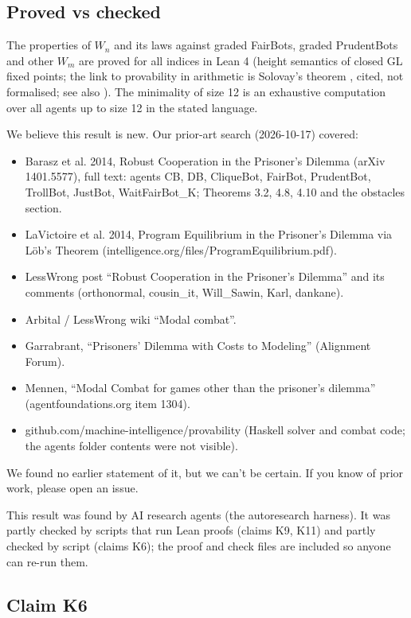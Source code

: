 \documentclass{article}
\begin{document}
\subsection*{Proved vs checked}

The properties of $W_n$ and its laws against graded FairBots, graded PrudentBots and other
$W_m$ are proved for all indices in Lean 4 (height semantics of closed GL fixed points; the link
to provability in arithmetic is Solovay's theorem \cite{solovay1976provability}, cited, not formalised; see also \cite{boolos1993logic}). The minimality of size
12 is an exhaustive computation over all agents up to size 12 in the stated language.

We believe this result is new. Our prior-art search (2026-10-17) covered:

\begin{itemize}
\item Barasz et al. 2014, Robust Cooperation in the Prisoner's Dilemma (arXiv 1401.5577), full text: agents CB, DB, CliqueBot, FairBot, PrudentBot, TrollBot, JustBot, WaitFairBot\_K; Theorems 3.2, 4.8, 4.10 and the obstacles section.
\item LaVictoire et al. 2014, Program Equilibrium in the Prisoner's Dilemma via Löb's Theorem (intelligence.org/files/ProgramEquilibrium.pdf).
\item LessWrong post ``Robust Cooperation in the Prisoner's Dilemma'' and its comments (orthonormal, cousin\_it, Will\_Sawin, Karl, dankane).
\item Arbital / LessWrong wiki ``Modal combat''.
\item Garrabrant, ``Prisoners' Dilemma with Costs to Modeling'' (Alignment Forum).
\item Mennen, ``Modal Combat for games other than the prisoner's dilemma'' (agentfoundations.org item 1304).
\item github.com/machine-intelligence/provability (Haskell solver and combat code; the agents folder contents were not visible).
\end{itemize}

We found no earlier statement of it, but we can't be certain. If you know of prior work, please open an issue.

This result was found by AI research agents (the autoresearch harness). It was partly checked by scripts that run Lean proofs (claims K9, K11) and partly checked by script (claims K6); the proof and check files are included so anyone can re-run them.

\subsection*{Claim K6}
\end{document}

